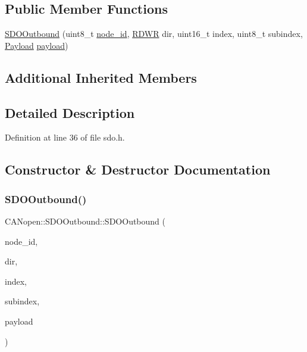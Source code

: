\subsection*{Public Member Functions}
\begin{DoxyCompactItemize}
\item 
\hyperlink{class_c_a_nopen_1_1_s_d_o_outbound_ac43a44aaaa9356e3ddab74d008c5a3ca}{S\+D\+O\+Outbound} (uint8\+\_\+t \hyperlink{class_c_a_nopen_1_1_message_a845fe0c7682bd6eeef0a5dd87b5e3c63}{node\+\_\+id}, \hyperlink{class_c_a_nopen_1_1_s_d_o_message_aba8926782f1557b8d7d90f430b26cd8d}{R\+D\+WR} dir, uint16\+\_\+t index, uint8\+\_\+t subindex, \hyperlink{class_c_a_nopen_1_1_payload}{Payload} \hyperlink{class_c_a_nopen_1_1_s_d_o_message_a051509ddb3a59dfe066f9d90c80c2eec}{payload})
\end{DoxyCompactItemize}
\subsection*{Additional Inherited Members}


\subsection{Detailed Description}


Definition at line 36 of file sdo.\+h.



\subsection{Constructor \& Destructor Documentation}
\mbox{\label{class_c_a_nopen_1_1_s_d_o_outbound_ac43a44aaaa9356e3ddab74d008c5a3ca}} 
\subsubsection{\texorpdfstring{S\+D\+O\+Outbound()}{SDOOutbound()}}
{\footnotesize\ttfamily C\+A\+Nopen\+::\+S\+D\+O\+Outbound\+::\+S\+D\+O\+Outbound (\begin{DoxyParamCaption}\item[{uint8\+\_\+t}]{node\+\_\+id,  }\item[{\hyperlink{class_c_a_nopen_1_1_s_d_o_message_aba8926782f1557b8d7d90f430b26cd8d}{R\+D\+WR}}]{dir,  }\item[{uint16\+\_\+t}]{index,  }\item[{uint8\+\_\+t}]{subindex,  }\item[{\hyperlink{class_c_a_nopen_1_1_payload}{Payload}}]{payload }\end{DoxyParamCaption})}



